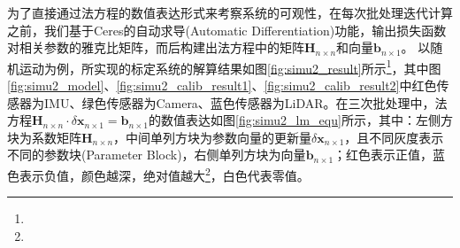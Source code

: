 为了直接通过法方程的数值表达形式来考察系统的可观性，在每次批处理迭代计算之前，我们基于Ceres的自动求导(Automatic Differentiation)功能，输出损失函数对相关参数的雅克比矩阵，而后构建出法方程中的矩阵$\boldsymbol{H}_{n\times n}$和向量$\boldsymbol{b}_{n\times 1}$。
以随机运动为例，所实现的标定系统的解算结果如图\ref{fig:simu2_result}所示\footnote{}，其中图\ref{fig:simu2_model}、\ref{fig:simu2_calib_result1}、\ref{fig:simu2_calib_result2}中红色传感器为IMU、绿色传感器为Camera、蓝色传感器为LiDAR。在三次批处理中，法方程$\boldsymbol{H}_{n\times n}\cdot\delta\boldsymbol{x}_{n\times 1}=\boldsymbol{b}_{n\times 1}$的数值表达如图\ref{fig:simu2_lm_equ}所示，其中：左侧方块为系数矩阵$\boldsymbol{H}_{n\times n}$，中间单列方块为参数向量的更新量$\delta\boldsymbol{x}_{n\times 1}$，且不同灰度表示不同的参数块(Parameter Block)，右侧单列方块为向量$\boldsymbol{b}_{n\times 1}$；红色表示正值，蓝色表示负值，颜色越深，绝对值越大\footnote{}，白色代表零值。

